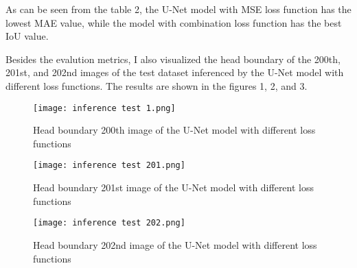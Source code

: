 \documentclass{article}
\begin{document}
\noindent As can be seen from the table 2, the U-Net model with MSE loss function has the lowest MAE value,
while the model with combination loss function has the best IoU value.

Besides the evalution metrics, I also visualized the head boundary of the 200th, 201st, and 202nd images of the test dataset
inferenced by the U-Net model with different loss functions. The results are shown in the figures 1, 2, and 3.

\begin{figure}[h]
    \centering
    \texttt{[image: inference test 1.png]}
    \caption{Head boundary 200th image of the U-Net model with different loss functions}
\end{figure}

\begin{figure}[h]
    \centering
    \texttt{[image: inference test 201.png]}
    \caption{Head boundary 201st image of the U-Net model with different loss functions}
\end{figure}

\begin{figure}[h]
    \centering
    \texttt{[image: inference test 202.png]}
    \caption{Head boundary 202nd image of the U-Net model with different loss functions}
\end{figure}
\end{document}
